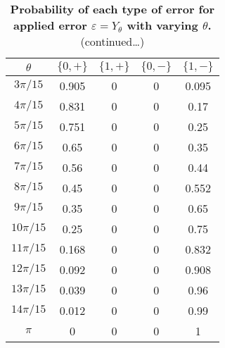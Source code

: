 \documentclass[superscriptaddress,twocolumn,showpacs,prb]{revtex4-1}
\begin{document}
\begin{table}[h!]
\begin{center}
 \begin{tabular}{c c c c c} 
 \hline
 \hline
 $\theta$ & $\{0 , +\}$ & $\{1 , +\}$&$\{0 , -\}$&$\{1 , -\}$ \\ [0.5ex] 
 \hline
 \hline
 $3\pi/15$ &0.905 &0 &0&0.095   \\ 
 \hline
 $4\pi/15$ &0.831 &0&0&0.17  \\
 \hline
 $5\pi/15$ & 0.751&0&0&0.25\\
 \hline
 $6\pi/15$ & 0.65&0&0&0.35   \\  
\hline
 $7\pi/15$ & 0.56&0&0&0.44   \\ 
 \hline
 $8\pi/15$ & 0.45&0&0&0.552 \\
 \hline
  $9\pi/15$&0.35&0&0&0.65\\
  \hline
  $10\pi/15$&0.25&0&0&0.75\\
  \hline
  $11\pi/15$&0.168&0&0&0.832\\
  \hline
  $12\pi/15$&0.092&0&0&0.908\\
  \hline
  $13\pi/15$&0.039&0&0&0.96\\
  \hline
 $14\pi/15$&0.012&0&0&0.99\\
  \hline
  $\pi$&0&0&0&1\\[1ex]
  \hline
 \hline
\end{tabular}
\caption{\textbf{Probability of each type of error for applied error $\varepsilon=Y_{\theta}$ with varying $\theta$.} (continued\dots) }
\label{qed_table5}
\end{center}
\end{table}
\end{document}
